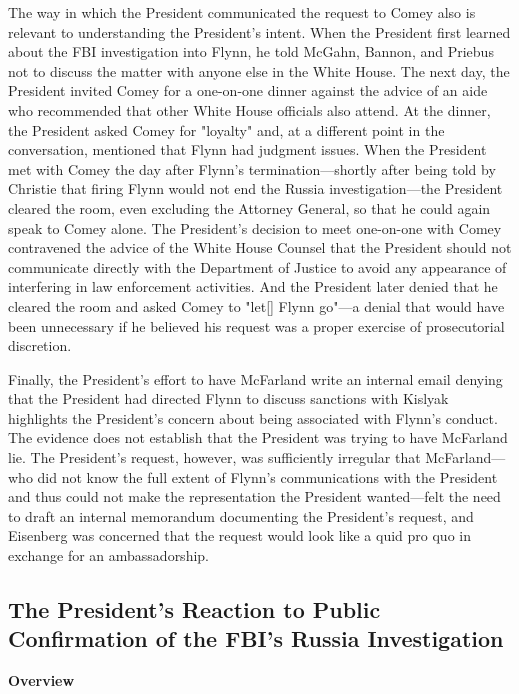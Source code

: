 The way in which the President communicated the request to Comey also is relevant to understanding the President's intent.
When the President first learned about the FBI investigation into Flynn, he told McGahn, Bannon, and Priebus not to discuss the matter with anyone else in the White House.
The next day, the President invited Comey for a one-on-one dinner against the advice of an aide who recommended that other White House officials also attend.
At the dinner, the President asked Comey for "loyalty" and, at a different point in the conversation, mentioned that Flynn had judgment issues.
When the President met with Comey the day after Flynn's termination---shortly after being told by Christie that firing Flynn would not end the Russia investigation---the President cleared the room, even excluding the Attorney General, so that he could again speak to Comey alone.
The President's decision to meet one-on-one with Comey contravened the advice of the White House Counsel that the President should not communicate directly with the Department of Justice to avoid any appearance of interfering in law enforcement activities.
And the President later denied that he cleared the room and asked Comey to "let[] Flynn go"---a denial that would have been unnecessary if he believed his request was a proper exercise of prosecutorial discretion.

Finally, the President's effort to have McFarland write an internal email denying that the President had directed Flynn to discuss sanctions with Kislyak highlights the President's concern about being associated with Flynn's conduct.
The evidence does not establish that the President was trying to have McFarland lie.
The President's request, however, was sufficiently irregular that McFarland---who did not know the full extent of Flynn's communications with the President and thus could not make the representation the President wanted---felt the need to draft an internal memorandum documenting the President's request, and Eisenberg was concerned that the request would look like a quid pro quo in exchange for an ambassadorship.

\subsection{The President's Reaction to Public Confirmation of the FBI's Russia Investigation}

\begin{center}
\textbf{Overview}
\end{center}

